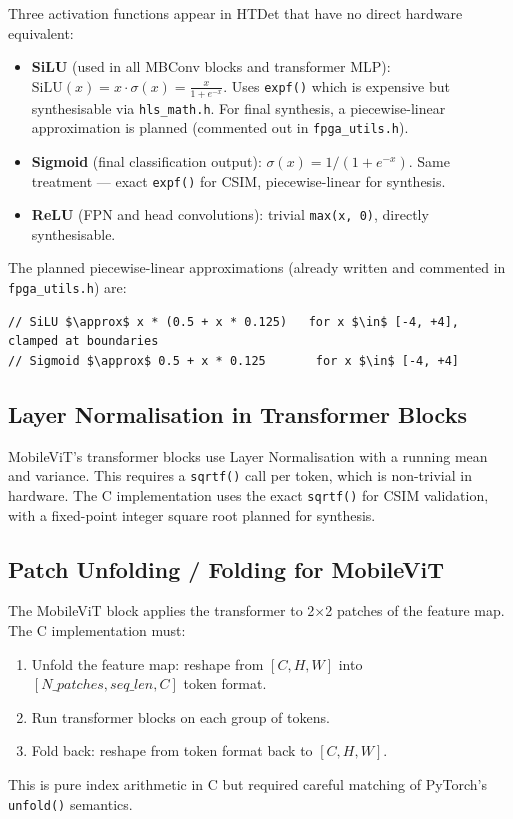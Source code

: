 Three activation functions appear in HTDet that have no direct hardware equivalent:

\begin{itemize}
    \item \textbf{SiLU} (used in all MBConv blocks and transformer MLP): $\text{SiLU}(x) = x \cdot \sigma(x) = \frac{x}{1 + e^{-x}}$. Uses \texttt{expf()} which is expensive but synthesisable via \texttt{hls\_math.h}. For final synthesis, a piecewise-linear approximation is planned (commented out in \texttt{fpga\_utils.h}).
    \item \textbf{Sigmoid} (final classification output): $\sigma(x) = 1 / (1 + e^{-x})$. Same treatment — exact \texttt{expf()} for CSIM, piecewise-linear for synthesis.
    \item \textbf{ReLU} (FPN and head convolutions): trivial \texttt{max(x, 0)}, directly synthesisable.
\end{itemize}

The planned piecewise-linear approximations (already written and commented in \texttt{fpga\_utils.h}) are:

\begin{verbatim}
// SiLU $\approx$ x * (0.5 + x * 0.125)   for x $\in$ [-4, +4], clamped at boundaries
// Sigmoid $\approx$ 0.5 + x * 0.125       for x $\in$ [-4, +4]
\end{verbatim}

\subsection{Layer Normalisation in Transformer Blocks}

MobileViT's transformer blocks use Layer Normalisation with a running mean and variance. This requires a \texttt{sqrtf()} call per token, which is non-trivial in hardware. The C implementation uses the exact \texttt{sqrtf()} for CSIM validation, with a fixed-point integer square root planned for synthesis.

\subsection{Patch Unfolding / Folding for MobileViT}

The MobileViT block applies the transformer to 2$\times$2 patches of the feature map. The C implementation must:
\begin{enumerate}
    \item Unfold the feature map: reshape from $[C, H, W]$ into $[N\_patches, seq\_len, C]$ token format.
    \item Run transformer blocks on each group of tokens.
    \item Fold back: reshape from token format back to $[C, H, W]$.
\end{enumerate}
This is pure index arithmetic in C but required careful matching of PyTorch's \texttt{unfold()} semantics.

